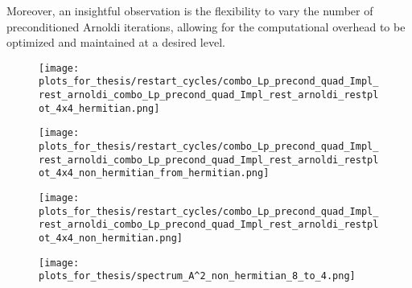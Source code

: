 Moreover, an insightful observation is the flexibility to vary the number of preconditioned Arnoldi iterations, allowing for the computational overhead to be optimized and maintained at a desired level.

\begin{figure}[H]
    \centering
    \begin{minipage}{0.45\textwidth}
        \centering
        \texttt{[image: plots\_for\_thesis/restart\_cycles/combo\_Lp\_precond\_quad\_Impl\_rest\_arnoldi\_combo\_Lp\_precond\_quad\_Impl\_rest\_arnoldi\_restplot\_4x4\_hermitian.png]} %
    \end{minipage}%
    \hspace{0.02\textwidth} %
    \begin{minipage}{0.45\textwidth}
        \centering
        \texttt{[image: plots\_for\_thesis/restart\_cycles/combo\_Lp\_precond\_quad\_Impl\_rest\_arnoldi\_combo\_Lp\_precond\_quad\_Impl\_rest\_arnoldi\_restplot\_4x4\_non\_hermitian\_from\_hermitian.png]} %
    \end{minipage}
    
    \vspace{0.02\textwidth} %
    
    \begin{minipage}{0.45\textwidth}
        \centering
        \texttt{[image: plots\_for\_thesis/restart\_cycles/combo\_Lp\_precond\_quad\_Impl\_rest\_arnoldi\_combo\_Lp\_precond\_quad\_Impl\_rest\_arnoldi\_restplot\_4x4\_non\_hermitian.png]} %
    \end{minipage}%
    \hspace{0.02\textwidth} %
    \begin{minipage}{0.45\textwidth}
        \centering
        \texttt{[image: plots\_for\_thesis/spectrum\_A^2\_non\_hermitian\_8\_to\_4.png]} %
    \end{minipage}


\end{figure}
